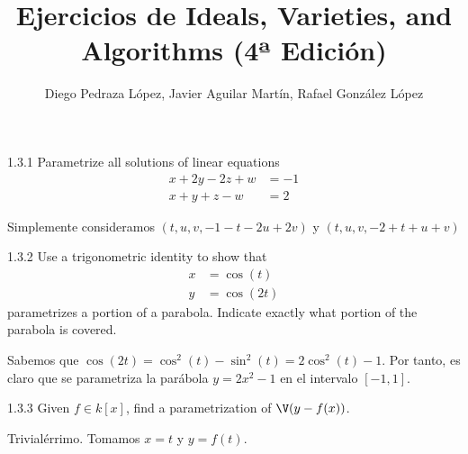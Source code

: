 \documentclass[twoside]{article}
\begin{document}
\title{Ejercicios de Ideals, Varieties, and Algorithms (4ª Edición)}
\author{Diego Pedraza López, Javier Aguilar Martín, Rafael González López}
\maketitle

\begin{ejercicio}{1.3.1}
Parametrize all solutions of linear equations
\begin{align*}
x+2y-2z+w&=-1\\
x+y+z-w&=2
\end{align*}
\end{ejercicio}
\begin{solucion}
Simplemente consideramos $(t,u,v,-1-t-2u+2v)$ y $(t,u,v,-2+t+u+v)$
\end{solucion}

\newpage

\begin{ejercicio}{1.3.2}
Use a trigonometric identity to show that
\begin{align*}
x&=\cos(t)\\
y&=\cos(2t)
\end{align*}
parametrizes a portion of a parabola. Indicate exactly what portion of the parabola is covered.
\end{ejercicio}
\begin{solucion}
Sabemos que $\cos(2t)=\cos^2(t)-\sin^2(t) = 2\cos^2(t)-1$. Por tanto, es claro que se parametriza la parábola $y=2x^2-1$ en el intervalo $[-1,1]$.
\end{solucion}

\newpage

\begin{ejercicio}{1.3.3}
Given $f\in k[x]$, find a parametrization of $\V(y-f(x))$.
\end{ejercicio}
\begin{solucion}
Trivialérrimo. Tomamos $x=t$ y $y=f(t)$.
\end{solucion}

\newpage
\end{document}
